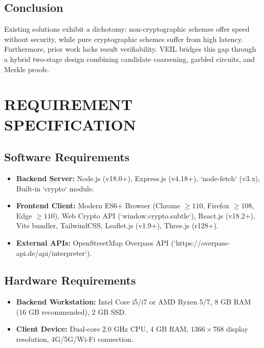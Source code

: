 \documentclass[12pt,a4paper,oneside]{report}
\begin{document}
\section{Conclusion}
Existing solutions exhibit a dichotomy: non-cryptographic schemes offer speed without security, while pure cryptographic schemes suffer from high latency. Furthermore, prior work lacks result verifiability. VEIL bridges this gap through a hybrid two-stage design combining candidate coarsening, garbled circuits, and Merkle proofs.


\chapter{REQUIREMENT SPECIFICATION}

\section{Software Requirements}
\begin{itemize}
    \item \textbf{Backend Server:} Node.js (v18.0+), Express.js (v4.18+), `node-fetch` (v3.x), Built-in `crypto` module.
    \item \textbf{Frontend Client:} Modern ES6+ Browser (Chrome $\ge 110$, Firefox $\ge 108$, Edge $\ge 110$), Web Crypto API (`window.crypto.subtle`), React.js (v18.2+), Vite bundler, TailwindCSS, Leaflet.js (v1.9+), Three.js (r128+).
    \item \textbf{External APIs:} OpenStreetMap Overpass API (`https://overpass-api.de/api/interpreter`).
\end{itemize}

\section{Hardware Requirements}
\begin{itemize}
    \item \textbf{Backend Workstation:} Intel Core i5/i7 or AMD Ryzen 5/7, 8 GB RAM (16 GB recommended), 2 GB SSD.
    \item \textbf{Client Device:} Dual-core 2.0 GHz CPU, 4 GB RAM, $1366 \times 768$ display resolution, 4G/5G/Wi-Fi connection.
\end{itemize}
\end{document}
